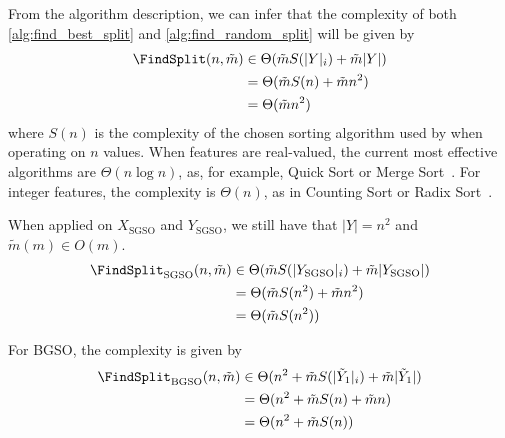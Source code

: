 From the algorithm description, we can infer that the complexity of both \autoref{alg:find_best_split} and \autoref{alg:find_random_split} will be given by
%
\begin{align}
    \FindSplit(n, \tilde m)
    &\in \Theta(\tilde m S(|Y|_i) + \tilde m|Y|)
    \nonumber\\
    &= \Theta(\tilde m S(n) + \tilde m n^2)
    \nonumber\\
    &= \Theta(\tilde m n^2)
    \label{eq:O_find_best_split}
\end{align}
where $S(n)$ is the complexity of the chosen sorting algorithm used by \FindSplit when operating on $n$ values.
%
When features are real-valued, the current most effective algorithms are $\Theta(n \log n)$, as, for example, Quick Sort or Merge Sort~\cite{cormen2022introduction}.
For integer features, the complexity is $\Theta(n)$, as in Counting Sort or Radix Sort~\cite{cormen2022introduction}.  %

When applied on $X_\text{SGSO}$ and $Y_\text{SGSO}$, we still have that $|Y| = n^2$ 
and $\tilde m(m) \in O(m)$.
%
\begin{align}
    \FindSplit_\text{SGSO}(n, \tilde m)
    &\in \Theta(\tilde m S(|Y_\text{SGSO}|_i) + \tilde m|Y_\text{SGSO}|)
    \nonumber\\ 
    &= \Theta(\tilde m S(n^2) + \tilde m n^2)
    \nonumber\\ 
    &= \Theta(\tilde m S(n^2))
    \label{eq:O_sgso}
\end{align}

For BGSO, the complexity is given by
%
\begin{align}
    \FindSplit_\text{BGSO}(n, \tilde m)
    &\in \Theta(n^2 + \tilde m S(|\tilde Y_1|_i) + \tilde m|\tilde Y_1|)
    \nonumber\\ 
    &= \Theta(n^2 + \tilde m S(n) + \tilde m n)
    \nonumber\\ 
    &= \Theta(n^2 + \tilde m S(n))
    \label{eq:O_bgso}
\end{align}

